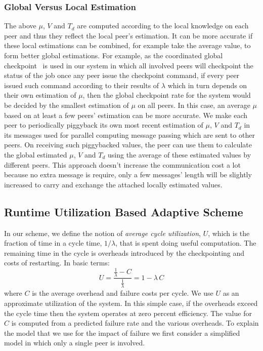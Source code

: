 \documentclass[times, 12pt, onecolumn]{article}
\begin{document}
\subsubsection{Global Versus Local Estimation}
The above $\mu$, $V$ and $T_d$ are computed according to the local knowledge
on each peer and thus they reflect the local peer's estimation. It can be more accurate if these local
estimations can be combined, for example take the average value, to form better global estimations. For example, 
as the coordinated global checkpoint~\cite{ChandyL85} is used in our system in which all involved peers will 
checkpoint the status of the job once any peer issue the checkpoint command, if every peer issued such 
command according to their results of $\lambda$ which in turn depends on their own estimation of $\mu$, then
the global checkpoint rate for the system would be decided by the smallest estimation of $\mu$ on all peers. 
In this case, an average $\mu$ based on at least a few peers' estimation 
can be more accurate. We make each peer to periodically piggyback its own most recent 
estimation of $\mu$, $V$ and $T_d$ in its messages used for parallel computing message passing which are sent 
to other peers. On receiving such piggybacked values, the peer can use them to calculate the global estimated 
$\mu$, $V$ and $T_d$ using the average of these estimated values by different peers. This approach doesn't 
increase the communication cost a lot because no extra message is require, only a few messages' length will be 
slightly increased to carry and exchange the attached locally estimated values. 

\subsection{Runtime Utilization Based Adaptive Scheme}
\label{model}
In our scheme, we define the notion of \emph{average cycle utilization}, $U$,
which is the fraction of time in a cycle time, $1/\lambda$, that is spent doing
useful computation. The remaining time in the cycle is overheads introduced by
the checkpointing and costs of restarting.  In basic terms:
\begin{equation}
U =\frac{\frac{1}{\lambda}-C}{\frac{1}{\lambda}}=1-\lambda\, C
\label{u-eq}
\end{equation}
where $C$ is the average overhead and failure costs per cycle. We use $U$ as an
approximate utilization of the system. In this simple case, if the overheads
exceed the cycle time then the system operates at zero percent efficiency. The
value for $C$ is computed from a predicted failure rate and the various
overheads.  To explain the model that we use for the impact of failure we first
consider a simplified model in which only a single peer is involved. 
\end{document}
